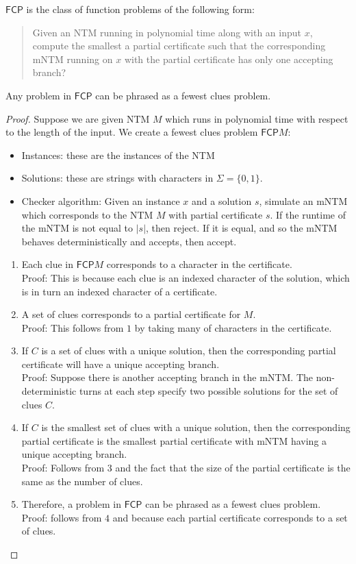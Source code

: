 \documentclass[runningheads,a4paper]{llncs}
\begin{document}
\begin{definition}
$\mathsf{FCP}$ is the class of function problems of the following form:
\begin{quote}
Given an NTM running in polynomial time along with an input $x$, compute the smallest a partial certificate such that the corresponding mNTM running on $x$ with the partial certificate has only one accepting branch?
\end{quote}
\end{definition}

\begin{proposition}
Any problem in $\mathsf{FCP}$ can be phrased as a fewest clues problem.
\end{proposition}

\begin{proof}
Suppose we are given NTM $M$ which runs in polynomial time with respect to the length of the input. We create a fewest clues problem $\mathsf{FCP} M$:
\begin{itemize}
\item Instances: these are the instances of the NTM
\item Solutions: these are strings with characters in $\Sigma = \{ 0, 1 \}$.
\item Checker algorithm: Given an instance $x$ and a solution $s$, simulate an mNTM which corresponds to the NTM $M$ with partial certificate $s$. If the runtime of the mNTM is not equal to $|s|$, then reject. If it is equal, and so the mNTM behaves deterministically and accepts, then accept. 
\end{itemize}
\begin{enumerate}
\item Each clue in $\mathsf{FCP} M$ corresponds to a character in the certificate.\\
Proof: This is because each clue is an indexed character of the solution, which is in turn an indexed character of a certificate.
\item A set of clues corresponds to a partial certificate for $M$.\\
Proof: This follows from $1$ by taking many of characters in the certificate.
\item If $C$ is a set of clues with a unique solution, then the corresponding partial certificate will have a unique accepting branch.\\
Proof: Suppose there is another accepting branch in the mNTM. The non-deterministic turns at each step specify two possible solutions for the set of clues $C$. 
\item If $C$ is the smallest set of clues with a unique solution, then the corresponding partial certificate is the smallest partial certificate with mNTM having a unique accepting branch.\\
Proof: Follows from 3 and the fact that the size of the partial certificate is the same as the number of clues.
\item Therefore, a problem in $\mathsf{FCP}$ can be phrased as a fewest clues problem.\\
Proof: follows from $4$ and because each partial certificate corresponds to a set of clues.
\end{enumerate}
\end{proof}
\end{document}
